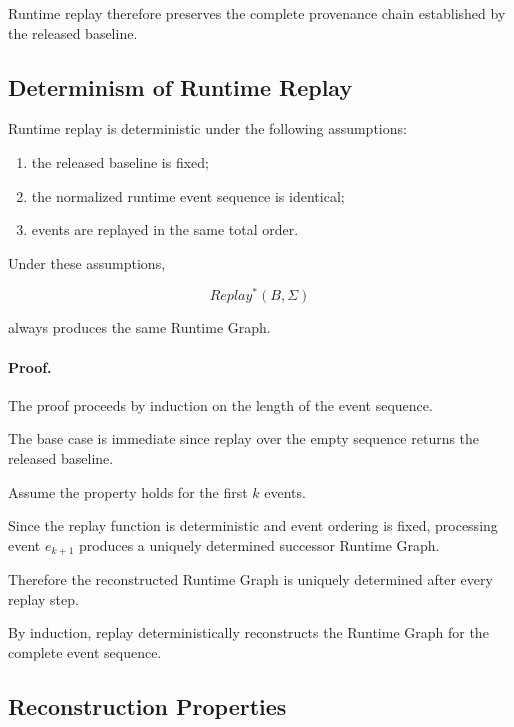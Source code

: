 \documentclass[10pt]{article}
\begin{document}
Runtime replay therefore preserves the complete provenance chain established by
the released baseline.

\subsection{Determinism of Runtime Replay}
\label{appendix:runtime_determinism}

Runtime replay is deterministic under the following assumptions:

\begin{enumerate}
	\item the released baseline is fixed;
	\item the normalized runtime event sequence is identical;
	\item events are replayed in the same total order.
\end{enumerate}

Under these assumptions,

\[
Replay^*(B,\Sigma)
\]

always produces the same Runtime Graph.

\paragraph*{Proof.}

The proof proceeds by induction on the length of the event sequence.

The base case is immediate since replay over the empty sequence returns the
released baseline.

Assume the property holds for the first $k$ events.

Since the replay function is deterministic and event ordering is fixed,
processing event $e_{k+1}$ produces a uniquely determined successor Runtime
Graph.

Therefore the reconstructed Runtime Graph is uniquely determined after every
replay step.

By induction, replay deterministically reconstructs the Runtime Graph for the
complete event sequence.

\subsection{Reconstruction Properties}
\label{appendix:runtime_properties}
\end{document}
